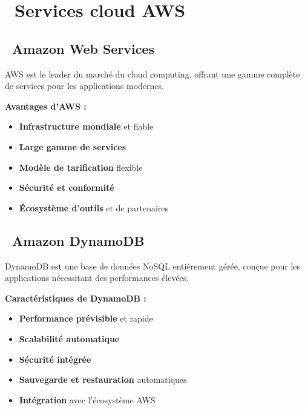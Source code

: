 \section{\faCloud\ Services cloud AWS}

\subsection{\faAws\ Amazon Web Services}

\begin{infobox}
AWS est le leader du marché du cloud computing, offrant une gamme complète de services pour les applications modernes.
\end{infobox}

\textbf{\color{primaryblue}Avantages d'AWS :}
\begin{itemize}
    \item \textcolor{accentgreen}{\textbf{Infrastructure mondiale}} et fiable
    \item \textcolor{accentgreen}{\textbf{Large gamme de services}}
    \item \textcolor{accentgreen}{\textbf{Modèle de tarification}} flexible
    \item \textcolor{accentgreen}{\textbf{Sécurité et conformité}}
    \item \textcolor{accentgreen}{\textbf{Écosystème d'outils}} et de partenaires
\end{itemize}

\subsection{\faDatabase\ Amazon DynamoDB}

DynamoDB est une base de données NoSQL entièrement gérée, conçue pour les applications nécessitant des performances élevées.

\textbf{\color{primaryblue}Caractéristiques de DynamoDB :}
\begin{itemize}
    \item \textcolor{primaryblue}{\textbf{Performance prévisible}} et rapide
    \item \textcolor{primaryblue}{\textbf{Scalabilité automatique}}
    \item \textcolor{primaryblue}{\textbf{Sécurité intégrée}}
    \item \textcolor{primaryblue}{\textbf{Sauvegarde et restauration}} automatiques
    \item \textcolor{primaryblue}{\textbf{Intégration}} avec l'écosystème AWS
\end{itemize}

